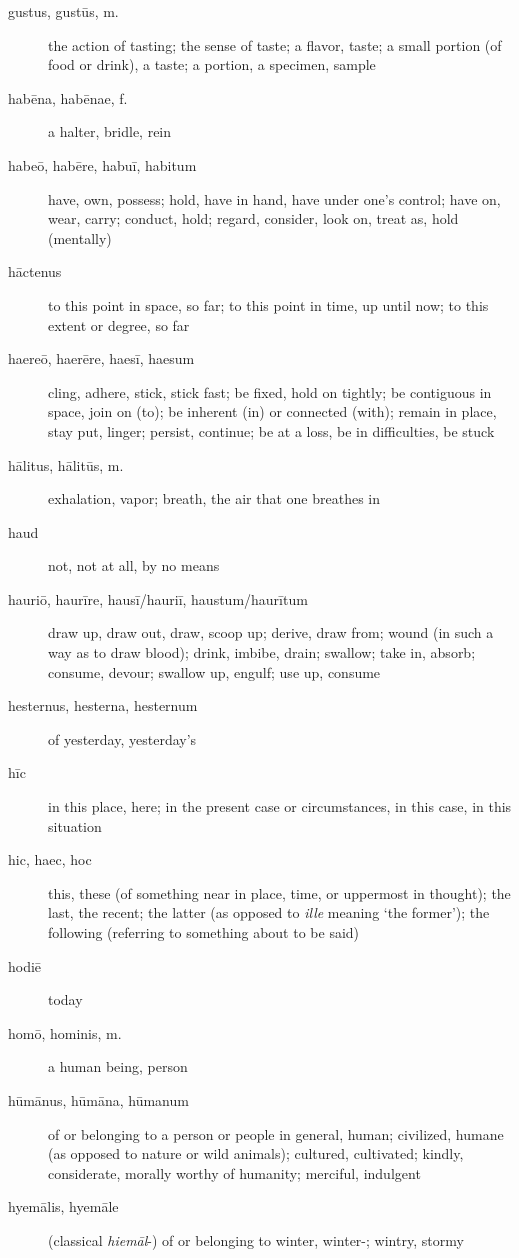 \begin{description}
    \item[gustus, gustūs, m.] the action of tasting; the sense of taste; a flavor, taste; a small portion (of food or drink), a taste; a portion, a specimen, sample
    \item[habēna, habēnae, f.] a halter, bridle, rein
    \item[habeō, habēre, habuī, habitum] \marginnote{*}have, own, possess; hold, have in hand, have under one's control; have on, wear, carry; conduct, hold; regard, consider, look on, treat as, hold (mentally)
    \item[hāctenus] to this point in space, so far; to this point in time, up until now; to this extent or degree, so far
    \item[haereō, haerēre, haesī, haesum] cling, adhere, stick, stick fast; be fixed, hold on tightly; be contiguous in space, join on (to); be inherent (in) or connected (with); remain in place, stay put, linger; persist, continue; be at a loss, be in difficulties, be stuck
    \item[hālitus, hālitūs, m.] exhalation, vapor; breath, the air that one breathes in
    \item[haud] \marginnote{*}not, not at all, by no means
    \item[hauriō, haurīre, hausī/hauriī, haustum/haurītum] draw up, draw out, draw, scoop up; derive, draw from; wound (in such a way as to draw blood); drink, imbibe, drain; swallow; take in, absorb; consume, devour; swallow up, engulf; use up, consume
    \item[hesternus, hesterna, hesternum] of yesterday, yesterday's
    \item[hīc] \marginnote{*}in this place, here; in the present case or circumstances, in this case, in this situation
    \item[hic, haec, hoc] \marginnote{*}this, these (of something near in place, time, or uppermost in thought); the last, the recent; the latter (as opposed to \textit{ille} meaning `the former'); the following (referring to something about to be said)
    \item[hodiē] \marginnote{*}today
    \item[homō, hominis, m.] \marginnote{*}a human being, person
    \item[hūmānus, hūmāna, hūmanum] \marginnote{*}of or belonging to a person or people in general, human; civilized, humane (as opposed to nature or wild animals); cultured, cultivated; kindly, considerate, morally worthy of humanity; merciful, indulgent
    \item[hyemālis, hyemāle] (classical \textit{hiemāl}-) of or belonging to winter, winter-; wintry, stormy

\end{description}
